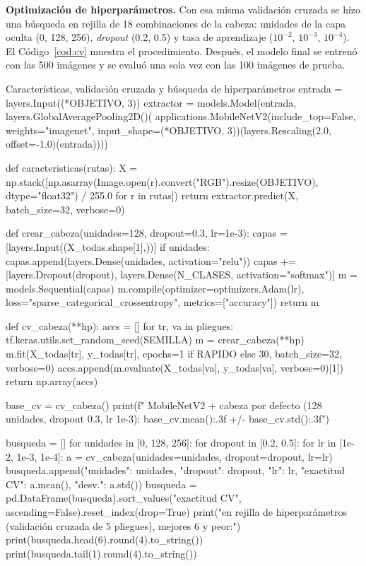 \documentclass[11pt,letterpaper]{article}
\begin{document}
\textbf{Optimización de hiperparámetros.} Con esa misma validación cruzada se hizo una búsqueda en rejilla de 18 combinaciones de la cabeza: unidades de la capa oculta (0, 128, 256), \textit{dropout} (0.2, 0.5) y tasa de aprendizaje ($10^{-2}$, $10^{-3}$, $10^{-4}$). El Código~\ref{cod:cv} muestra el procedimiento. Después, el modelo final se entrenó con las 500 imágenes y se evaluó una sola vez con las 100 imágenes de prueba.

\begin{codigo}[label=cod:cv]{Características, validación cruzada y búsqueda de hiperparámetros}
entrada = layers.Input((*OBJETIVO, 3))
extractor = models.Model(entrada, layers.GlobalAveragePooling2D()(
    applications.MobileNetV2(include_top=False, weights="imagenet", input_shape=(*OBJETIVO, 3))(layers.Rescaling(2.0, offset=-1.0)(entrada))))


def caracteristicas(rutas):
    X = np.stack([np.asarray(Image.open(r).convert("RGB").resize(OBJETIVO), dtype="float32") / 255.0 for r in rutas])
    return extractor.predict(X, batch_size=32, verbose=0)

def crear_cabeza(unidades=128, dropout=0.3, lr=1e-3):
    capas = [layers.Input((X_todas.shape[1],))]
    if unidades:
        capas.append(layers.Dense(unidades, activation="relu"))
    capas += [layers.Dropout(dropout), layers.Dense(N_CLASES, activation="softmax")]
    m = models.Sequential(capas)
    m.compile(optimizer=optimizers.Adam(lr), loss="sparse_categorical_crossentropy", metrics=["accuracy"])
    return m


def cv_cabeza(**hp):
    accs = []
    for tr, va in pliegues:
        tf.keras.utils.set_random_seed(SEMILLA)
        m = crear_cabeza(**hp)
        m.fit(X_todas[tr], y_todas[tr], epochs=1 if RAPIDO else 30, batch_size=32, verbose=0)
        accs.append(m.evaluate(X_todas[va], y_todas[va], verbose=0)[1])
    return np.array(accs)


base_cv = cv_cabeza()
print(f"  MobileNetV2 + cabeza por defecto (128 unidades, dropout 0.3, lr 1e-3): {base_cv.mean():.3f} +/- {base_cv.std():.3f}")

busqueda = []
for unidades in [0, 128, 256]:
    for dropout in [0.2, 0.5]:
        for lr in [1e-2, 1e-3, 1e-4]:
            a = cv_cabeza(unidades=unidades, dropout=dropout, lr=lr)
            busqueda.append({"unidades": unidades, "dropout": dropout, "lr": lr, "exactitud CV": a.mean(), "desv.": a.std()})
busqueda = pd.DataFrame(busqueda).sort_values("exactitud CV", ascending=False).reset_index(drop=True)
print(" en rejilla de hiperparámetros (validación cruzada de 5 pliegues), mejores 6 y peor:")
print(busqueda.head(6).round(4).to_string())
print(busqueda.tail(1).round(4).to_string())
\end{codigo}
\end{document}
